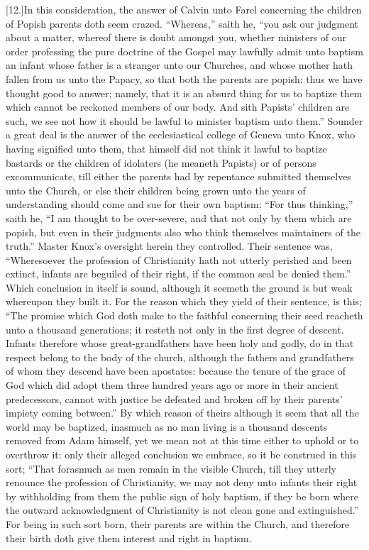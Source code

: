 [12.]In this consideration, the answer of Calvin unto Farel concerning the children of Popish parents doth seem crazed. “Whereas,” saith he, “you ask our judgment about a matter, whereof there is doubt amongst you, whether ministers of our order professing the pure doctrine of the Gospel may lawfully admit unto baptism an infant whose father is a stranger unto our Churches, and whose mother hath fallen from us unto the Papacy, so that both the parents are popish: thus we have thought good to answer; namely, that it is an absurd thing for us to baptize them which cannot be reckoned members of our body. And sith Papists’  children are such, we see not how it should be lawful to minister baptism unto them.” Sounder a great deal is the answer of the ecclesiastical college of Geneva unto Knox, who having signified unto them, that himself did not think it lawful to baptize bastards or the children of idolaters (he meaneth Papists) or of persons excommunicate, till either the parents had by repentance submitted themselves unto the Church, or else their children being grown unto the years of understanding should come and sue for their own baptism: “For thus thinking,” saith he, “I am thought to be over-severe, and that not only by them which are popish, but even in their judgments also who think themselves maintainers of the truth.” Master Knox’s oversight herein they controlled. Their sentence was, “Wheresoever the profession of Christianity hath not utterly perished and been extinct, infants are beguiled of their right, if the common seal be denied them.” Which conclusion in itself is sound, although it seemeth the ground is but weak whereupon they built it. For the reason which they yield of their sentence, is this; “The promise which God doth make to the faithful concerning their seed reacheth unto a thousand generations; it resteth not only in the first degree of descent. Infants therefore whose great-grandfathers have been holy and godly, do in that respect belong to the body of the church, although the fathers and grandfathers of whom they descend have been apostates: because the tenure of the grace of God which did adopt them three hundred years ago or more in their ancient predecessors, cannot with justice be defeated and broken off by their parents’ impiety coming between.”  By which reason of theirs although it seem that all the world may be baptized, inasmuch as no man living is a thousand descents removed from Adam himself, yet we mean not at this time either to uphold or to overthrow it: only their alleged conclusion we embrace, so it be construed in this sort; “That forasmuch as men remain in the visible Church, till they utterly renounce the profession of Christianity, we may not deny unto infants their right by withholding from them the public sign of holy baptism, if they be born where the outward acknowledgment of Christianity is not clean gone and extinguished.” For being in such sort born, their parents are within the Church, and therefore their birth doth give them interest and right in baptism.

